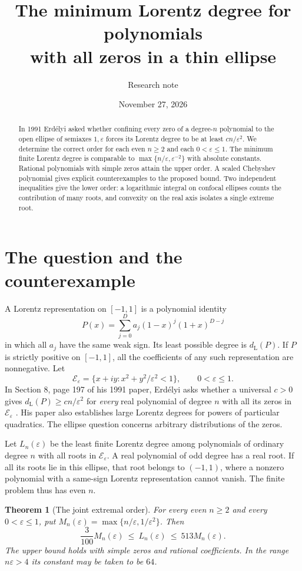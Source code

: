 \documentclass[11pt]{article}
\title{\bfseries The minimum Lorentz degree for polynomials\\ with all zeros in a thin ellipse}
\author{Research note}
\date{November 27, 2026}
\newtheorem{theorem}{Theorem}
\newcommand{\dd}{d_{\mathrm L}}
\begin{document}
\maketitle
\begin{abstract}
In 1991 Erd\'elyi asked whether confining every zero of a degree-$n$ polynomial to the open ellipse of semiaxes $1,\varepsilon$ forces its Lorentz degree to be at least $cn/\varepsilon^2$. We determine the correct order for each even $n\ge2$ and each $0<\varepsilon\le1$. The minimum finite Lorentz degree is comparable to $\max\{n/\varepsilon,\varepsilon^{-2}\}$ with absolute constants. Rational polynomials with simple zeros attain the upper order. A scaled Chebyshev polynomial gives explicit counterexamples to the proposed bound. Two independent inequalities give the lower order: a logarithmic integral on confocal ellipses counts the contribution of many roots, and convexity on the real axis isolates a single extreme root.
\end{abstract}

\section{The question and the counterexample}
A Lorentz representation on $[-1,1]$ is a polynomial identity
\[
   P(x)=\sum_{j=0}^{D} a_j(1-x)^j(1+x)^{D-j}
\]
in which all $a_j$ have the same weak sign. Its least possible degree is $\dd(P)$. If $P$ is strictly positive on $[-1,1]$, all the coefficients of any such representation are nonnegative. Let
\[
 \mathcal E_\varepsilon=\{x+iy:x^2+y^2/\varepsilon^2<1\},\qquad 0<\varepsilon\le1.
\]
In Section 8, page 197 of his 1991 paper, Erd\'elyi asks whether a universal $c>0$ gives $\dd(P)\ge c n/\varepsilon^2$ for \emph{every} real polynomial of degree $n$ with all its zeros in $\mathcal E_\varepsilon$ \cite{erd}. His paper also establishes large Lorentz degrees for powers of particular quadratics. The ellipse question concerns arbitrary distributions of the zeros.

Let $L_n(\varepsilon)$ be the least finite Lorentz degree among polynomials of ordinary degree $n$ with all roots in $\mathcal E_\varepsilon$. A real polynomial of odd degree has a real root. If all its roots lie in this ellipse, that root belongs to $(-1,1)$, where a nonzero polynomial with a same-sign Lorentz representation cannot vanish. The finite problem thus has even $n$.

\begin{theorem}[The joint extremal order]\label{joint}
For every even $n\ge2$ and every $0<\varepsilon\le1$, put
$M_n(\varepsilon)=\max\{n/\varepsilon,1/\varepsilon^2\}$. Then
\begin{equation}\label{answer}
 \boxed{\qquad \frac{3}{100}M_n(\varepsilon)\ \le\ L_n(\varepsilon)\
              \le\ 513M_n(\varepsilon).\qquad}
\end{equation}
The upper bound holds with simple zeros and rational coefficients. In the range $n\varepsilon>4$ its constant may be taken to be $64$.
\end{theorem}
\end{document}
